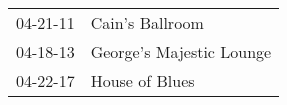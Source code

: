 \begin{supertabular}{p{0.07\textwidth}p{0.23\textwidth}}
 04-21-11 &           Cain's Ballroom \\
 04-18-13 &  George's Majestic Lounge \\
 04-22-17 &            House of Blues \\
\end{supertabular}
